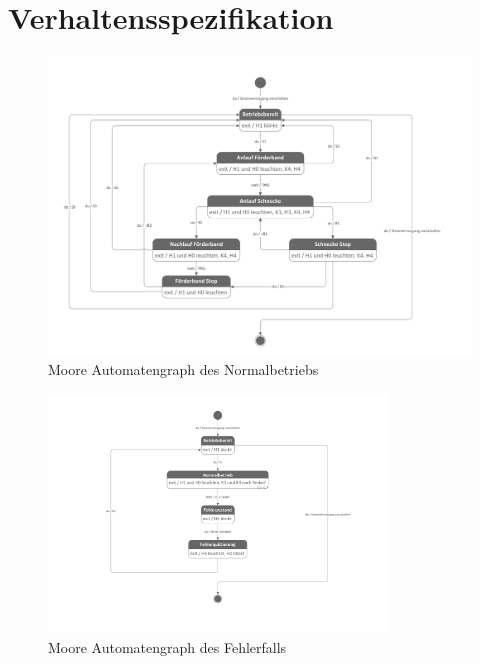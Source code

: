\section{Verhaltensspezifikation}

\begin{figure}[H]
   \centering
   \includegraphics[width=1.0\textwidth]{Bilder/1. Konzept/Normalbetrieb.pdf}
   \caption[Automatengraph Normalbetrieb]{Moore Automatengraph des Normalbetriebs}
   \label{fig:Bild4}
\end{figure}

\begin{figure}[H]
   \centering
   \includegraphics[width=0.8\textwidth]{Bilder/1. Konzept/Fehlerfall.pdf}
   \caption[Automatengraph Fehlerfall]{Moore Automatengraph des Fehlerfalls}
   \label{fig:Bild5}
\end{figure}
